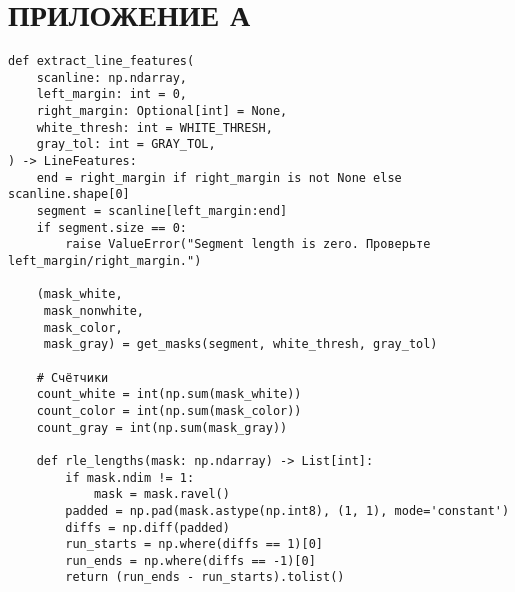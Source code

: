 \section*{ПРИЛОЖЕНИЕ А}


% 

\begin{lstlisting}[caption={Функция для выделения характеристик строки пикселей (часть 1)}, label={lst:elf}]
def extract_line_features(
    scanline: np.ndarray,
    left_margin: int = 0,
    right_margin: Optional[int] = None,
    white_thresh: int = WHITE_THRESH,
    gray_tol: int = GRAY_TOL,
) -> LineFeatures:
    end = right_margin if right_margin is not None else scanline.shape[0]
    segment = scanline[left_margin:end]
    if segment.size == 0:
        raise ValueError("Segment length is zero. Проверьте left_margin/right_margin.")

    (mask_white,
     mask_nonwhite,
     mask_color,
     mask_gray) = get_masks(segment, white_thresh, gray_tol)

    # Счётчики
    count_white = int(np.sum(mask_white))
    count_color = int(np.sum(mask_color))
    count_gray = int(np.sum(mask_gray))

    def rle_lengths(mask: np.ndarray) -> List[int]:
        if mask.ndim != 1:
            mask = mask.ravel()
        padded = np.pad(mask.astype(np.int8), (1, 1), mode='constant')
        diffs = np.diff(padded)
        run_starts = np.where(diffs == 1)[0]
        run_ends = np.where(diffs == -1)[0]
        return (run_ends - run_starts).tolist()
\end{lstlisting}

\newpage

